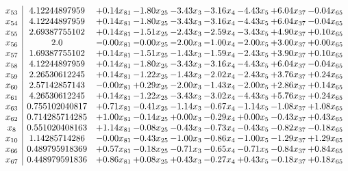 \documentclass[8pt]{article}
\begin{document}
\[\begin{array}{c| c c@{\hskip 2pt} c@{\hskip 2pt} c@{\hskip 2pt} c@{\hskip 2pt} c@{\hskip 2pt} c@{\hskip 2pt} c@{\hskip 2pt} }
 x_{53}   &  4.12244897959 & +  0.14 x_{81} & -1.80 x_{25} & -3.43 x_{3} & -3.16 x_{4} & -4.43 x_{5} & +  6.04 x_{37} & -0.04 x_{65}\\
 x_{54}   &  4.12244897959 & +  0.14 x_{81} & -1.80 x_{25} & -3.43 x_{3} & -3.16 x_{4} & -4.43 x_{5} & +  6.04 x_{37} & -0.04 x_{65}\\
 x_{55}   &  2.69387755102 & +  0.14 x_{81} & -1.51 x_{25} & -2.43 x_{3} & -2.59 x_{4} & -3.43 x_{5} & +  4.90 x_{37} & +  0.10 x_{65}\\
 x_{56}   &  2.0 & -0.00 x_{81} & -0.00 x_{25} & -2.00 x_{3} & -1.00 x_{4} & -2.00 x_{5} & +  3.00 x_{37} & +  0.00 x_{65}\\
 x_{57}   &  1.69387755102 & +  0.14 x_{81} & -1.51 x_{25} & -1.43 x_{3} & -1.59 x_{4} & -2.43 x_{5} & +  3.90 x_{37} & +  0.10 x_{65}\\
 x_{58}   &  4.12244897959 & +  0.14 x_{81} & -1.80 x_{25} & -3.43 x_{3} & -3.16 x_{4} & -4.43 x_{5} & +  6.04 x_{37} & -0.04 x_{65}\\
 x_{59}   &  2.26530612245 & +  0.14 x_{81} & -1.22 x_{25} & -1.43 x_{3} & -2.02 x_{4} & -2.43 x_{5} & +  3.76 x_{37} & +  0.24 x_{65}\\
 x_{60}   &  2.57142857143 & -0.00 x_{81} & +  0.29 x_{25} & -2.00 x_{3} & -1.43 x_{4} & -2.00 x_{5} & +  2.86 x_{37} & +  0.14 x_{65}\\
 x_{61}   &  4.26530612245 & +  0.14 x_{81} & -1.22 x_{25} & -3.43 x_{3} & -3.02 x_{4} & -4.43 x_{5} & +  5.76 x_{37} & +  0.24 x_{65}\\
 x_{63}   &  0.755102040817 & +  0.71 x_{81} & -0.41 x_{25} & -1.14 x_{3} & -0.67 x_{4} & -1.14 x_{5} & -1.08 x_{37} & +  1.08 x_{65}\\
 x_{62}   &  0.714285714285 & +  1.00 x_{81} & -0.14 x_{25} & +  0.00 x_{3} & -0.29 x_{4} & +  0.00 x_{5} & -0.43 x_{37} & +  0.43 x_{65}\\
 x_{8}   &  0.551020408163 & +  1.14 x_{81} & -0.08 x_{25} & -0.43 x_{3} & -0.73 x_{4} & -0.43 x_{5} & -0.82 x_{37} & -0.18 x_{65}\\
 x_{10}   &  1.14285714286 & -0.00 x_{81} & -0.43 x_{25} & -1.00 x_{3} & -0.86 x_{4} & -1.00 x_{5} & -1.29 x_{37} & +  1.29 x_{65}\\
 x_{66}   &  0.489795918369 & +  0.57 x_{81} & -0.18 x_{25} & -0.71 x_{3} & -0.65 x_{4} & -0.71 x_{5} & -0.84 x_{37} & +  0.84 x_{65}\\
 x_{67}   &  0.448979591836 & +  0.86 x_{81} & +  0.08 x_{25} & +  0.43 x_{3} & -0.27 x_{4} & +  0.43 x_{5} & -0.18 x_{37} & +  0.18 x_{65}\\

\end{array}\]
\end{document}
